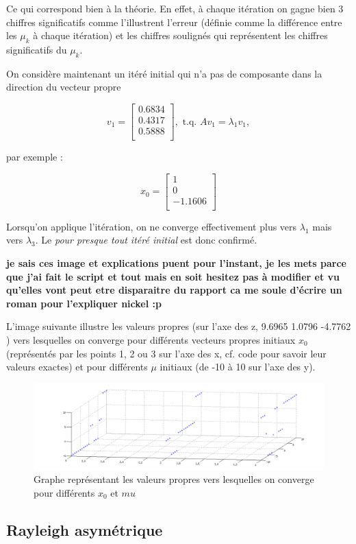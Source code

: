Ce qui correspond bien à la théorie. En effet, à chaque itération on gagne bien 3 chiffres significatifs comme l'illustrent l'erreur (définie comme la différence entre les $\mu_k$ à chaque itération) et les chiffres soulignés qui représentent les chiffres significatifs du $\mu_k$.

On considère maintenant un itéré initial qui n'a pas de composante dans la direction du vecteur propre  

$$ v_1 = \left[
\begin{array}{c}
  0.6834  \\
   0.4317 \\
   0.5888 \\
\end{array}
\right], \text{ t.q. } Av_1 = \lambda_1 v_1,$$

par exemple  :

$$ x_0 = \left[
\begin{array}{c}
  1  \\
  0 \\
  -1.1606\\
\end{array}
\right]$$

Lorsqu'on applique l'itération, on ne converge effectivement plus vers $\lambda_1$ mais vers $\lambda_3$. Le \textit{pour presque tout itéré initial} est donc confirmé.

\textbf{je sais ces image et explications puent pour l'instant, je les mets parce que j'ai fait le script et tout mais en soit hesitez pas à modifier et vu qu'elles vont peut etre disparaitre du rapport ca me soule d'écrire un roman pour l'expliquer nickel :p}

L'image suivante illustre les valeurs propres (sur l'axe des z, 9.6965 1.0796 -4.7762 ) vers lesquelles on converge pour différents vecteurs propres initiaux $x_0$ (représentés par les points 1, 2 ou 3 sur l'axe des x, cf. code pour savoir leur valeurs exactes) et pour différents $\mu$ initiaux (de -10 à 10 sur l'axe des y).

\begin{figure}
  \centering
  \includegraphics[width=15cm]{RaySym.png}
  \caption{Graphe représentant les valeurs propres vers lesquelles on converge pour différents $x_0$ et $mu$}
  \label{fig:RaySym}
\end{figure}
\subsection*{Rayleigh asymétrique}


